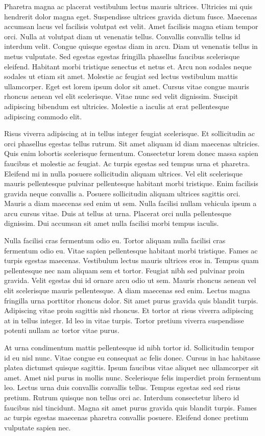 \documentclass[11pt,a4paper]{article}
\begin{document}
Pharetra magna ac placerat vestibulum lectus mauris ultrices. Ultricies mi quis hendrerit dolor magna eget. Suspendisse ultrices gravida dictum fusce. Maecenas accumsan lacus vel facilisis volutpat est velit. Amet facilisis magna etiam tempor orci. Nulla at volutpat diam ut venenatis tellus. Convallis convallis tellus id interdum velit. Congue quisque egestas diam in arcu. Diam ut venenatis tellus in metus vulputate. Sed egestas egestas fringilla phasellus faucibus scelerisque eleifend. Habitant morbi tristique senectus et netus et. Arcu non sodales neque sodales ut etiam sit amet. Molestie ac feugiat sed lectus vestibulum mattis ullamcorper. Eget est lorem ipsum dolor sit amet. Cursus vitae congue mauris rhoncus aenean vel elit scelerisque. Vitae nunc sed velit dignissim. Suscipit adipiscing bibendum est ultricies. Molestie a iaculis at erat pellentesque adipiscing commodo elit.

Risus viverra adipiscing at in tellus integer feugiat scelerisque. Et sollicitudin ac orci phasellus egestas tellus rutrum. Sit amet aliquam id diam maecenas ultricies. Quis enim lobortis scelerisque fermentum. Consectetur lorem donec massa sapien faucibus et molestie ac feugiat. Ac turpis egestas sed tempus urna et pharetra. Eleifend mi in nulla posuere sollicitudin aliquam ultrices. Vel elit scelerisque mauris pellentesque pulvinar pellentesque habitant morbi tristique. Enim facilisis gravida neque convallis a. Posuere sollicitudin aliquam ultrices sagittis orci. Mauris a diam maecenas sed enim ut sem. Nulla facilisi nullam vehicula ipsum a arcu cursus vitae. Duis at tellus at urna. Placerat orci nulla pellentesque dignissim. Dui accumsan sit amet nulla facilisi morbi tempus iaculis.

Nulla facilisi cras fermentum odio eu. Tortor aliquam nulla facilisi cras fermentum odio eu. Vitae sapien pellentesque habitant morbi tristique. Fames ac turpis egestas maecenas. Vestibulum lectus mauris ultrices eros in. Tempus quam pellentesque nec nam aliquam sem et tortor. Feugiat nibh sed pulvinar proin gravida. Velit egestas dui id ornare arcu odio ut sem. Mauris rhoncus aenean vel elit scelerisque mauris pellentesque. A diam maecenas sed enim. Lectus magna fringilla urna porttitor rhoncus dolor. Sit amet purus gravida quis blandit turpis. Adipiscing vitae proin sagittis nisl rhoncus. Et tortor at risus viverra adipiscing at in tellus integer. Id leo in vitae turpis. Tortor pretium viverra suspendisse potenti nullam ac tortor vitae purus.

At urna condimentum mattis pellentesque id nibh tortor id. Sollicitudin tempor id eu nisl nunc. Vitae congue eu consequat ac felis donec. Cursus in hac habitasse platea dictumst quisque sagittis. Ipsum faucibus vitae aliquet nec ullamcorper sit amet. Amet nisl purus in mollis nunc. Scelerisque felis imperdiet proin fermentum leo. Lectus urna duis convallis convallis tellus. Tempus egestas sed sed risus pretium. Rutrum quisque non tellus orci ac. Interdum consectetur libero id faucibus nisl tincidunt. Magna sit amet purus gravida quis blandit turpis. Fames ac turpis egestas maecenas pharetra convallis posuere. Eleifend donec pretium vulputate sapien nec.
\end{document}
